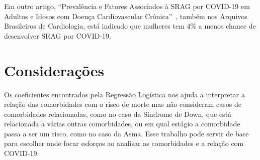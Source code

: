 Em outro artigo, ``Prevalência e Fatores Associados à SRAG por COVID-19 em Adultos e Idosos com Doença Cardiovascular Crônica''~\cite{paiva2021prevalencia}, também nos Arquivos Brasileiros de Cardiologia, está indicado que mulheres tem 4\% a menos chance de desenvolver SRAG por COVID-19.


\section{Considerações}
\label{sec:consideracoes}

Os coeficientes encontrados pela Regressão Logística nos ajuda a interpretar a relação das comorbidades com o risco de morte mas não consideram casos de comorbidades relacionadas, como no caso da Síndrome de Down, que está relacionada a várias outras comorbidades, ou em qual estágio a comorbidade passa a ser um risco, como no caso da Asma.
Esse trabalho pode servir de base para escolher onde focar esforços ao analisar as comorbidades e a relação com COVID-19.